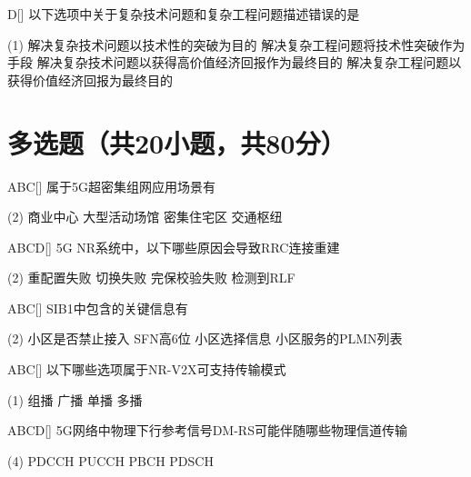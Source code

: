 \begin{choice}{D}[]
	以下选项中关于复杂技术问题和复杂工程问题描述错误的是
	\begin{tasks}(1)
		\task 解决复杂技术问题以技术性的突破为目的
		\task 解决复杂工程问题将技术性突破作为手段
		\task 解决复杂技术问题以获得高价值经济回报作为最终目的
		\task 解决复杂工程问题以获得价值经济回报为最终目的
	\end{tasks}
\end{choice}

\section{多选题（共20小题，共80分）}

\begin{choice}{\;ABC\;}[]
	属于5G超密集组网应用场景有
	\begin{tasks}(2)
		\task 商业中心
		\task 大型活动场馆
		\task 密集住宅区
		\task 交通枢纽
	\end{tasks}
\end{choice}

\begin{choice}{\;ABCD\;}[]
	5G NR系统中，以下哪些原因会导致RRC连接重建
	\begin{tasks}(2)
		\task 重配置失败
		\task 切换失败
		\task 完保校验失败
		\task 检测到RLF
	\end{tasks}
\end{choice}

\begin{choice}{\;ABC\;}[]
	SIB1中包含的关键信息有
	\begin{tasks}(2)
		\task 小区是否禁止接入
		\task SFN高6位
		\task 小区选择信息
		\task 小区服务的PLMN列表
	\end{tasks}
\end{choice}

\begin{choice}{\;ABC\;}[]
	以下哪些选项属于NR-V2X可支持传输模式
	\begin{tasks}(1)
		\task 组播
		\task 广播
		\task 单播
		\task 多播
	\end{tasks}
\end{choice}


\begin{choice}{\;ABCD\;}[]
	5G网络中物理下行参考信号DM-RS可能伴随哪些物理信道传输
	\begin{tasks}(4)
		\task PDCCH
		\task PUCCH
		\task PBCH
		\task PDSCH
	\end{tasks}
\end{choice}

